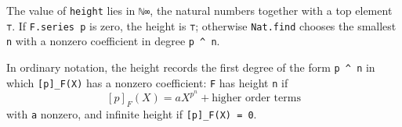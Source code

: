 The value of \lstinline|height| lies in \lstinline|ℕ∞|, the natural
numbers together with a top element \lstinline|⊤|.  If
\lstinline|F.series p| is zero, the height is \lstinline|⊤|; otherwise
\lstinline|Nat.find| chooses the smallest \lstinline|n| with a nonzero
coefficient in degree \lstinline|p ^ n|.

In ordinary notation, the height records the first degree of the form
\lstinline|p ^ n| in which \lstinline|[p]_F(X)| has a nonzero coefficient:
\lstinline|F| has height \lstinline|n| if
\[
  [p]_F(X) = a X^{p^n} + \text{higher order terms}
\]
with \lstinline|a| nonzero, and infinite height if
\lstinline|[p]_F(X) = 0|.